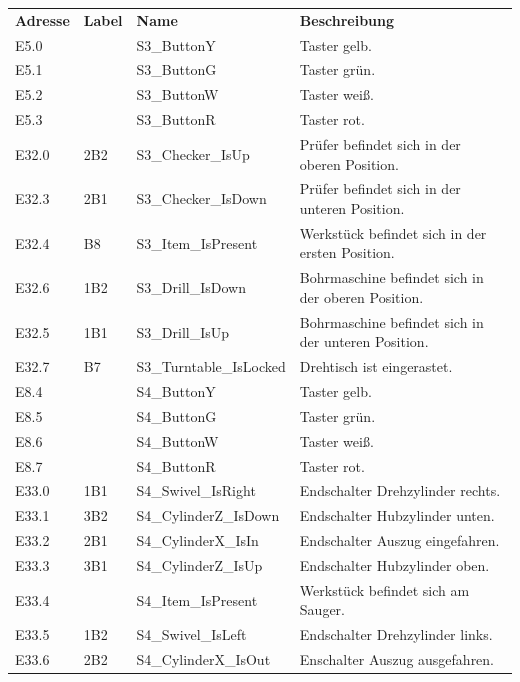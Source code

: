 \documentclass[11pt,a4paper,ngerman]{article}
\begin{document}
\begin{center}
	\setlength\extrarowheight{4pt}
	\small
	\begin{tabularx}{\textwidth}{|p{1.5cm}|p{1cm}|p{4cm}|X|}
		\hline
		\rowcolor{tublau}
		\multicolumn{4}{|c|}{\bf \color{white} \large Eingänge}\\
		\hline\hline
		\rowcolor{gray!80}
		\bf Adresse & \bf Label & \bf Name & \bf Beschreibung \\
		\hline\hline
		E5.0  &     & S3\_ButtonY & Taster gelb.\\
		E5.1  &     & S3\_ButtonG & Taster grün.\\
		E5.2  &     & S3\_ButtonW & Taster weiß.\\
		E5.3  &     & S3\_ButtonR & Taster rot.\\
		E32.0 & 2B2 & S3\_Checker\_IsUp & Prüfer befindet sich in der oberen Position.\\
		E32.3 & 2B1 & S3\_Checker\_IsDown & Prüfer befindet sich in der unteren Position.\\
		E32.4 & B8  & S3\_Item\_IsPresent & Werkstück befindet sich in der ersten Position.\\
		E32.6 & 1B2 & S3\_Drill\_IsDown & Bohrmaschine befindet sich in der oberen Position.\\
		E32.5 & 1B1 & S3\_Drill\_IsUp & Bohrmaschine befindet sich in der unteren Position.\\
		E32.7 & B7  & S3\_Turntable\_IsLocked & Drehtisch ist eingerastet.\\
		\hline
		E8.4  &     & S4\_ButtonY & Taster gelb.\\
		E8.5  &     & S4\_ButtonG & Taster grün.\\
		E8.6  &     & S4\_ButtonW & Taster weiß.\\
		E8.7  &     & S4\_ButtonR & Taster rot.\\
		E33.0 & 1B1 & S4\_Swivel\_IsRight & Endschalter Drehzylinder rechts.\\
		E33.1 & 3B2 & S4\_CylinderZ\_IsDown & Endschalter Hubzylinder unten.\\
		E33.2 & 2B1 & S4\_CylinderX\_IsIn & Endschalter Auszug eingefahren.\\
		E33.3 & 3B1 & S4\_CylinderZ\_IsUp & Endschalter Hubzylinder oben.\\
		E33.4 &     & S4\_Item\_IsPresent & Werkstück befindet sich am Sauger.\\
		E33.5 & 1B2 & S4\_Swivel\_IsLeft & Endschalter Drehzylinder links.\\
		E33.6 & 2B2 & S4\_CylinderX\_IsOut & Enschalter Auszug ausgefahren.\\		
		\hline
	\end{tabularx}
	

\end{center}
\end{document}
